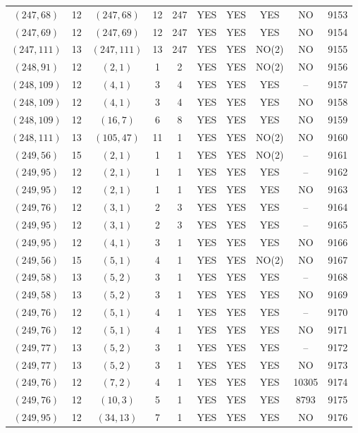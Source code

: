 \begin{longtable}{|c|c|c|c|c|c|c|c|c|c|}
$(247, 68)$ & 12 & $(247, 68)$ & 12 & 247 & YES & YES & YES & NO & 9153\\
$(247, 69)$ & 12 & $(247, 69)$ & 12 & 247 & YES & YES & YES & NO & 9154\\
$(247, 111)$ & 13 & $(247, 111)$ & 13 & 247 & YES & YES & NO(2) & NO & 9155\\
$(248, 91)$ & 12 & $(2, 1)$ & 1 & 2 & YES & YES & NO(2) & NO & 9156\\
$(248, 109)$ & 12 & $(4, 1)$ & 3 & 4 & YES & YES & YES & -- & 9157\\
$(248, 109)$ & 12 & $(4, 1)$ & 3 & 4 & YES & YES & YES & NO & 9158\\
$(248, 109)$ & 12 & $(16, 7)$ & 6 & 8 & YES & YES & YES & NO & 9159\\
$(248, 111)$ & 13 & $(105, 47)$ & 11 & 1 & YES & YES & NO(2) & NO & 9160\\
$(249, 56)$ & 15 & $(2, 1)$ & 1 & 1 & YES & YES & NO(2) & -- & 9161\\
$(249, 95)$ & 12 & $(2, 1)$ & 1 & 1 & YES & YES & YES & -- & 9162\\
$(249, 95)$ & 12 & $(2, 1)$ & 1 & 1 & YES & YES & YES & NO & 9163\\
$(249, 76)$ & 12 & $(3, 1)$ & 2 & 3 & YES & YES & YES & -- & 9164\\
$(249, 95)$ & 12 & $(3, 1)$ & 2 & 3 & YES & YES & YES & -- & 9165\\
$(249, 95)$ & 12 & $(4, 1)$ & 3 & 1 & YES & YES & YES & NO & 9166\\
$(249, 56)$ & 15 & $(5, 1)$ & 4 & 1 & YES & YES & NO(2) & NO & 9167\\
$(249, 58)$ & 13 & $(5, 2)$ & 3 & 1 & YES & YES & YES & -- & 9168\\
$(249, 58)$ & 13 & $(5, 2)$ & 3 & 1 & YES & YES & YES & NO & 9169\\
$(249, 76)$ & 12 & $(5, 1)$ & 4 & 1 & YES & YES & YES & -- & 9170\\
$(249, 76)$ & 12 & $(5, 1)$ & 4 & 1 & YES & YES & YES & NO & 9171\\
$(249, 77)$ & 13 & $(5, 2)$ & 3 & 1 & YES & YES & YES & -- & 9172\\
$(249, 77)$ & 13 & $(5, 2)$ & 3 & 1 & YES & YES & YES & NO & 9173\\
$(249, 76)$ & 12 & $(7, 2)$ & 4 & 1 & YES & YES & YES & 10305 & 9174\\
$(249, 76)$ & 12 & $(10, 3)$ & 5 & 1 & YES & YES & YES & 8793 & 9175\\
$(249, 95)$ & 12 & $(34, 13)$ & 7 & 1 & YES & YES & YES & NO & 9176\\

\end{longtable}
